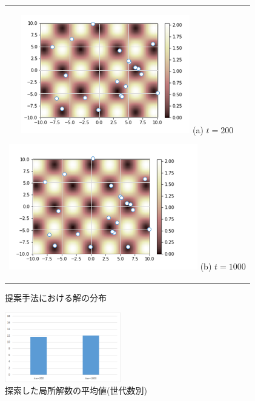 \documentclass{jarticle}
\begin{document}
\begin{figure}[h]
\begin{center}
\begin{tabular}{c}

\begin{minipage}[b]{0.45\linewidth}
\begin{center}
\includegraphics[keepaspectratio, scale=0.45]{sbat_200.bmp} (a) ${t=200}$
\end{center}
\end{minipage}

\begin{minipage}[b]{0.45\linewidth}
\begin{center}
\includegraphics[keepaspectratio, scale=0.45]{sbat01.bmp} (b) ${t=1000}$
\end{center}
\end{minipage}

\end{tabular}
\caption{提案手法における解の分布}
\label{fig:xbest_iter}
\end{center}
\end{figure}

\begin{figure}[h]
\begin{center}
\includegraphics[width=0.45\textwidth]{iterations.bmp}
\caption{探索した局所解数の平均値(世代数別)}
\label{fig:gene*fit}
\end{center}
\end{figure}
\end{document}

